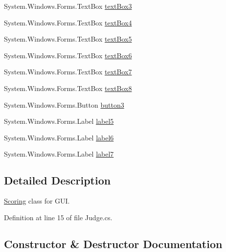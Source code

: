 \begin{DoxyCompactItemize}
\item 
System.\+Windows.\+Forms.\+Text\+Box \hyperlink{classPCO_1_1__0_1_1ScoringForm_a05ec3d37f45a4950e06b22c6974dcdbc}{text\+Box3}
\item 
System.\+Windows.\+Forms.\+Text\+Box \hyperlink{classPCO_1_1__0_1_1ScoringForm_a55e436955e52f177c61885d854da3a7d}{text\+Box4}
\item 
System.\+Windows.\+Forms.\+Text\+Box \hyperlink{classPCO_1_1__0_1_1ScoringForm_afccad5172710be1561f73c554d77ee59}{text\+Box5}
\item 
System.\+Windows.\+Forms.\+Text\+Box \hyperlink{classPCO_1_1__0_1_1ScoringForm_ae9fb74680f84b7e39a49625642aa1893}{text\+Box6}
\item 
System.\+Windows.\+Forms.\+Text\+Box \hyperlink{classPCO_1_1__0_1_1ScoringForm_a743b9df795f09a7afac4f252981cec70}{text\+Box7}
\item 
System.\+Windows.\+Forms.\+Text\+Box \hyperlink{classPCO_1_1__0_1_1ScoringForm_a1bdd53f49a48c5ce09d4f63365b7ecf4}{text\+Box8}
\item 
System.\+Windows.\+Forms.\+Button \hyperlink{classPCO_1_1__0_1_1ScoringForm_aaa0f5bd68251cbe3438f04f85c04b592}{button3}
\item 
System.\+Windows.\+Forms.\+Label \hyperlink{classPCO_1_1__0_1_1ScoringForm_ace66a75e3f343acdb65cc68d14b8ac2e}{label5}
\item 
System.\+Windows.\+Forms.\+Label \hyperlink{classPCO_1_1__0_1_1ScoringForm_aaa5fb477595b697132491cdac72ec1a5}{label6}
\item 
System.\+Windows.\+Forms.\+Label \hyperlink{classPCO_1_1__0_1_1ScoringForm_acf22d3bbb1a14fefc2fe9b90ee685619}{label7}
\end{DoxyCompactItemize}


\subsection{Detailed Description}
\hyperlink{classScoring}{Scoring} class for G\+UI. 

Definition at line 15 of file Judge.\+cs.



\subsection{Constructor \& Destructor Documentation}
\mbox{\label{classPCO_1_1__0_1_1ScoringForm_a853a6e4da6db5226f7536cee2faad9d0}} 
